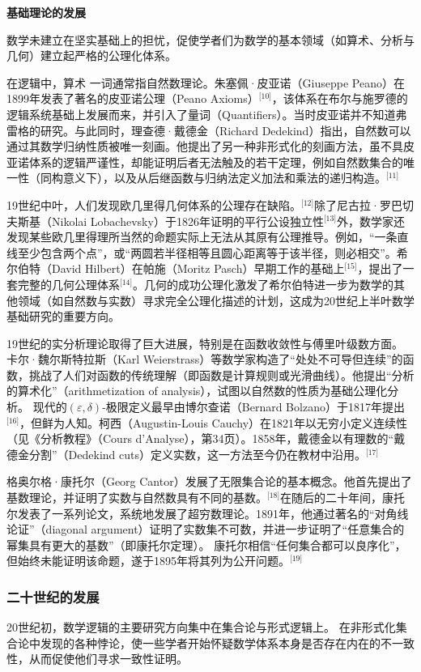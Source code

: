 \textbf{基础理论的发展}

数学未建立在坚实基础上的担忧，促使学者们为数学的基本领域（如算术、分析与几何）建立起严格的公理化体系。

在逻辑中，算术 一词通常指自然数理论。朱塞佩·皮亚诺（Giuseppe Peano）在1899年发表了著名的皮亚诺公理（Peano Axioms）\(^\text{[10]}\)，该体系在布尔与施罗德的逻辑系统基础上发展而来，并引入了量词（Quantifiers）。当时皮亚诺并不知道弗雷格的研究。与此同时，理查德·戴德金（Richard Dedekind）指出，自然数可以通过其数学归纳性质被唯一刻画。他提出了另一种非形式化的刻画方法，虽不具皮亚诺体系的逻辑严谨性，却能证明后者无法触及的若干定理，例如自然数集合的唯一性（同构意义下），以及从后继函数与归纳法定义加法和乘法的递归构造。\(^\text{[11]}\)

19世纪中叶，人们发现欧几里得几何体系的公理存在缺陷。\(^\text{[12]}\)除了尼古拉·罗巴切夫斯基（Nikolai Lobachevsky）于1826年证明的平行公设独立性\(^\text{[13]}\)外，数学家还发现某些欧几里得理所当然的命题实际上无法从其原有公理推导。例如，“一条直线至少包含两个点”，或“两圆若半径相等且圆心距离等于该半径，则必相交”。希尔伯特（David Hilbert）在帕施（Moritz Pasch）早期工作的基础上\(^\text{[15]}\)，提出了一套完整的几何公理体系\(^\text{[14]}\)。几何的成功公理化激发了希尔伯特进一步为数学的其他领域（如自然数与实数）寻求完全公理化描述的计划，这成为20世纪上半叶数学基础研究的重要方向。

19世纪的实分析理论取得了巨大进展，特别是在函数收敛性与傅里叶级数方面。  
卡尔·魏尔斯特拉斯（Karl Weierstrass）等数学家构造了“处处不可导但连续”的函数，挑战了人们对函数的传统理解（即函数是计算规则或光滑曲线）。他提出“分析的算术化”（arithmetization of analysis），试图以自然数的性质为基础公理化分析。 现代的\((\varepsilon, \delta)\)-极限定义最早由博尔查诺（Bernard Bolzano）于1817年提出\(^\text{[16]}\)，但鲜为人知。柯西（Augustin-Louis Cauchy）在1821年以无穷小定义连续性（见《分析教程》（Cours d’Analyse），第34页）。1858年，戴德金以有理数的“戴德金分割”（Dedekind cuts）定义实数，这一方法至今仍在教材中沿用。\(^\text{[17]}\)

格奥尔格·康托尔（Georg Cantor）发展了无限集合论的基本概念。他首先提出了基数理论，并证明了实数与自然数具有不同的基数。\(^\text{[18]}\)在随后的二十年间，康托尔发表了一系列论文，系统地发展了超穷数理论。1891年，他通过著名的“对角线论证”（diagonal argument）证明了实数集不可数，并进一步证明了“任意集合的幂集具有更大的基数”（即康托尔定理）。  康托尔相信“任何集合都可以良序化”，但始终未能证明该命题，遂于1895年将其列为公开问题。\(^\text{[19]}\)
\subsubsection{二十世纪的发展}
20世纪初，数学逻辑的主要研究方向集中在集合论与形式逻辑上。  
在非形式化集合论中发现的各种悖论，使一些学者开始怀疑数学体系本身是否存在内在的不一致性，从而促使他们寻求一致性证明。

